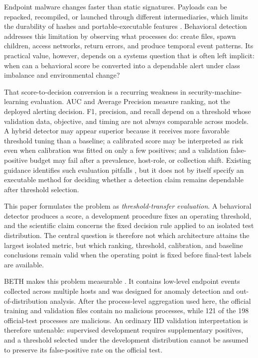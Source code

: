 \documentclass[10pt,journal,compsoc]{IEEEtran}
\begin{document}
Endpoint malware changes faster than static signatures. Payloads can be repacked, recompiled, or launched through different intermediaries, which limits the durability of hashes and portable-executable features \cite{sikorski2012,anderson2018}. Behavioral detection addresses this limitation by observing what processes do: create files, spawn children, access networks, return errors, and produce temporal event patterns. Its practical value, however, depends on a systems question that is often left implicit: when can a behavioral score be converted into a dependable alert under class imbalance and environmental change?

That score-to-decision conversion is a recurring weakness in security-machine-learning evaluation. AUC and Average Precision measure ranking, not the deployed alerting decision. F1, precision, and recall depend on a threshold whose validation data, objective, and timing are not always comparable across models. A hybrid detector may appear superior because it receives more favorable threshold tuning than a baseline; a calibrated score may be interpreted as risk even when calibration was fitted on only a few positives; and a validation false-positive budget may fail after a prevalence, host-role, or collection shift. Existing guidance identifies such evaluation pitfalls \cite{arp2022}, but it does not by itself specify an executable method for deciding whether a detection claim remains dependable after threshold selection.

This paper formulates the problem as \emph{threshold-transfer evaluation}. A behavioral detector produces a score, a development procedure fixes an operating threshold, and the scientific claim concerns the fixed decision rule applied to an isolated test distribution. The central question is therefore not which architecture attains the largest isolated metric, but which ranking, threshold, calibration, and baseline conclusions remain valid when the operating point is fixed before final-test labels are available.

BETH makes this problem measurable \cite{highnam2021}. It contains low-level endpoint events collected across multiple hosts and was designed for anomaly detection and out-of-distribution analysis. After the process-level aggregation used here, the official training and validation files contain no malicious processes, while 121 of the 198 official-test processes are malicious. An ordinary IID validation interpretation is therefore untenable: supervised development requires supplementary positives, and a threshold selected under the development distribution cannot be assumed to preserve its false-positive rate on the official test.
\end{document}
